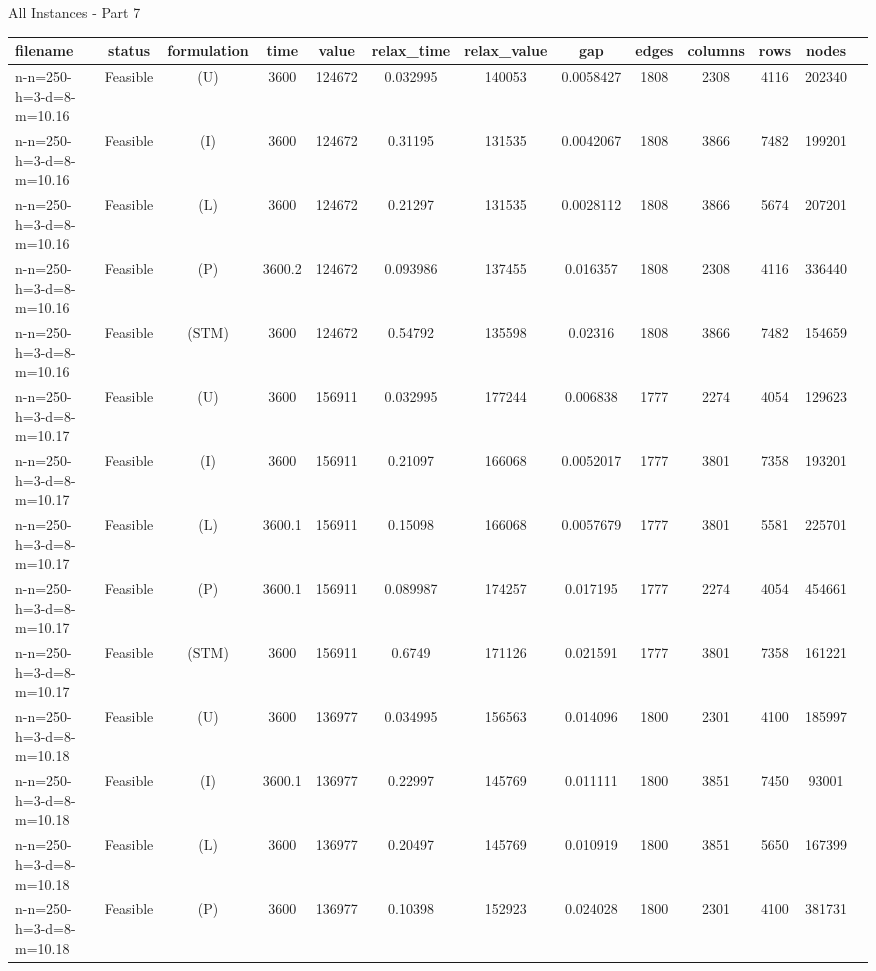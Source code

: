 \documentclass[landscape, a4paper]{article}
\newcommand{\STM}{\ensuremath{\mathrm{STM}}}
\newcommand{\Improved}{\ensuremath{\mathrm{I}}}
\newcommand{\Loose}{\ensuremath{\mathrm{L}}}
\newcommand{\Profit}{\ensuremath{\mathrm{P}}}
\newcommand{\Utility}{\ensuremath{\mathrm{U}}}
\begin{document}
\begin{center}
\newpage
All Instances - Part 7

\begin{tabular}{lcccccccccccc}
filename & status & formulation & time & value & relax\_time & relax\_value & gap & edges & columns & rows & nodes & \\
\hline
n-n=250-h=3-d=8-m=10.16 & Feasible & (\Utility) & 3600 & 124672 & 0.032995 & 140053 & 0.0058427 & 1808 & 2308 & 4116 & 202340 & \\
n-n=250-h=3-d=8-m=10.16 & Feasible & (\Improved) & 3600 & 124672 & 0.31195 & 131535 & 0.0042067 & 1808 & 3866 & 7482 & 199201 & \\
n-n=250-h=3-d=8-m=10.16 & Feasible & (\Loose) & 3600 & 124672 & 0.21297 & 131535 & 0.0028112 & 1808 & 3866 & 5674 & 207201 & \\
n-n=250-h=3-d=8-m=10.16 & Feasible & (\Profit) & 3600.2 & 124672 & 0.093986 & 137455 & 0.016357 & 1808 & 2308 & 4116 & 336440 & \\
n-n=250-h=3-d=8-m=10.16 & Feasible & (\STM) & 3600 & 124672 & 0.54792 & 135598 & 0.02316 & 1808 & 3866 & 7482 & 154659 & \\
n-n=250-h=3-d=8-m=10.17 & Feasible & (\Utility) & 3600 & 156911 & 0.032995 & 177244 & 0.006838 & 1777 & 2274 & 4054 & 129623 & \\
n-n=250-h=3-d=8-m=10.17 & Feasible & (\Improved) & 3600 & 156911 & 0.21097 & 166068 & 0.0052017 & 1777 & 3801 & 7358 & 193201 & \\
n-n=250-h=3-d=8-m=10.17 & Feasible & (\Loose) & 3600.1 & 156911 & 0.15098 & 166068 & 0.0057679 & 1777 & 3801 & 5581 & 225701 & \\
n-n=250-h=3-d=8-m=10.17 & Feasible & (\Profit) & 3600.1 & 156911 & 0.089987 & 174257 & 0.017195 & 1777 & 2274 & 4054 & 454661 & \\
n-n=250-h=3-d=8-m=10.17 & Feasible & (\STM) & 3600 & 156911 & 0.6749 & 171126 & 0.021591 & 1777 & 3801 & 7358 & 161221 & \\
n-n=250-h=3-d=8-m=10.18 & Feasible & (\Utility) & 3600 & 136977 & 0.034995 & 156563 & 0.014096 & 1800 & 2301 & 4100 & 185997 & \\
n-n=250-h=3-d=8-m=10.18 & Feasible & (\Improved) & 3600.1 & 136977 & 0.22997 & 145769 & 0.011111 & 1800 & 3851 & 7450 & 93001 & \\
n-n=250-h=3-d=8-m=10.18 & Feasible & (\Loose) & 3600 & 136977 & 0.20497 & 145769 & 0.010919 & 1800 & 3851 & 5650 & 167399 & \\
n-n=250-h=3-d=8-m=10.18 & Feasible & (\Profit) & 3600 & 136977 & 0.10398 & 152923 & 0.024028 & 1800 & 2301 & 4100 & 381731 & \\

\end{tabular}
\end{center}
\end{document}
